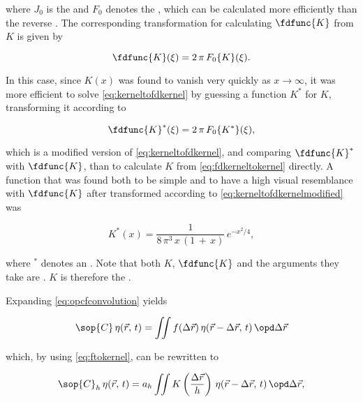 where $J_0$ is the  and $F_0$ denotes the , which can be calculated more efficiently than the reverse . The corresponding transformation for calculating $\fdfunc{K}$ from $K$ is given by

\begin{equation} \label{eq:kerneltofdkernel}
\fdfunc{K}(\xi) = 2\,\pi\,F_0\{K\}(\xi).
\end{equation}

In this case, since $K(x)$ was found to vanish very quickly as $x\rightarrow\infty$, it was more efficient to solve \eqref{eq:kerneltofdkernel} by guessing a function $K^*$ for $K$, transforming it according to

\begin{equation} \label{eq:kerneltofdkernelmodified}
\fdfunc{K}^*(\xi) = 2\,\pi\,F_0\{K^*\}(\xi),
\end{equation}

which is a modified version of \eqref{eq:kerneltofdkernel}, and comparing $\fdfunc{K}^*$ with $\fdfunc{K}$, than to calculate $K$ from \eqref{eq:fdkerneltokernel} directly. A function that was found both to be simple and to have a high visual resemblance with $\fdfunc{K}$ after transformed according to \eqref{eq:kerneltofdkernelmodified} was

\begin{equation} \label{eq:empirical}
K^*(x) = \frac{1}{8\,\pi^3\,x\,(1\,+\,x)}\,e^{-x^2/4},
\end{equation}

where $^*$ denotes an \estimate. Note that both $K$, $\fdfunc{K}$ and the arguments they take are . $K$ is therefore the .

%
%

Expanding \eqref{eq:opcfconvolution} yields

\begin{equation} \label{eq:opcfintegral}
\sop{C}\,\eta(\vec{r},\,t) = \iint f(\Delta\vec{r})\,\eta(\vec{r}-\Delta\vec{r},\,t)\,\opd\Delta\vec{r}
\end{equation}

which, by using \eqref{eq:ftokernel}, can be rewritten to

\begin{equation} \label{eq:opchunknown}
\sop{C}_h\,\eta(\vec{r},\,t) = a_h\iint K\left(\frac{\Delta\vec{r}}{h}\right)\,\eta(\vec{r}-\Delta\vec{r},\,t)\,\opd\Delta\vec{r},
\end{equation}

